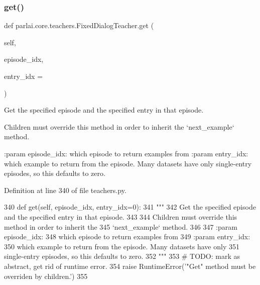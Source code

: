 \subsubsection{\texorpdfstring{get()}{get()}}
{\footnotesize\ttfamily def parlai.\+core.\+teachers.\+Fixed\+Dialog\+Teacher.\+get (\begin{DoxyParamCaption}\item[{}]{self,  }\item[{}]{episode\+\_\+idx,  }\item[{}]{entry\+\_\+idx = {} }\end{DoxyParamCaption})}

\begin{DoxyVerb}Get the specified episode and the specified entry in that episode.

Children must override this method in order to inherit the
`next_example` method.

:param episode_idx:
    which episode to return examples from
:param entry_idx:
    which example to return from the episode.  Many datasets have only
    single-entry episodes, so this defaults to zero.
\end{DoxyVerb}
 

Definition at line 340 of file teachers.\+py.


\begin{DoxyCode}
340     \textcolor{keyword}{def }get(self, episode\_idx, entry\_idx=0):
341         \textcolor{stringliteral}{"""}
342 \textcolor{stringliteral}{        Get the specified episode and the specified entry in that episode.}
343 \textcolor{stringliteral}{}
344 \textcolor{stringliteral}{        Children must override this method in order to inherit the}
345 \textcolor{stringliteral}{        `next\_example` method.}
346 \textcolor{stringliteral}{}
347 \textcolor{stringliteral}{        :param episode\_idx:}
348 \textcolor{stringliteral}{            which episode to return examples from}
349 \textcolor{stringliteral}{        :param entry\_idx:}
350 \textcolor{stringliteral}{            which example to return from the episode.  Many datasets have only}
351 \textcolor{stringliteral}{            single-entry episodes, so this defaults to zero.}
352 \textcolor{stringliteral}{        """}
353         \textcolor{comment}{# TODO: mark as abstract, get rid of runtime error.}
354         \textcolor{keywordflow}{raise} RuntimeError(\textcolor{stringliteral}{'"Get" method must be overriden by children.'})
355 
\end{DoxyCode}
\mbox{\label{classparlai_1_1core_1_1teachers_1_1FixedDialogTeacher_a49100faf9af79c6e24ddac9e36151d54}} 
